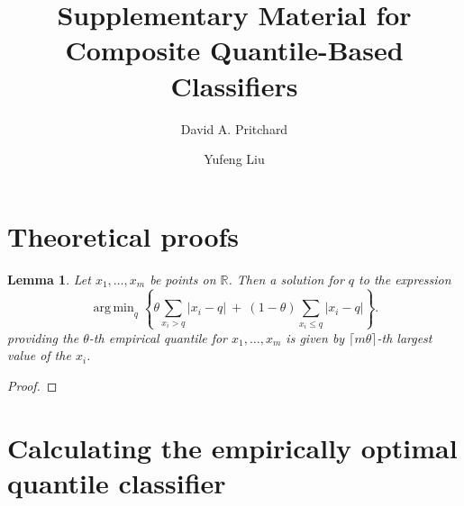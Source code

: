 \documentclass{article}
\DeclareMathOperator*{\argmin}{arg\,min}
\newtheorem{lemma}[theorem]{Lemma}
\begin{document}
\title{Supplementary Material for Composite Quantile-Based Classifiers}
\author[1]{David A. Pritchard}
\author[2]{Yufeng Liu}
\date{}
\maketitle

\section{Theoretical proofs}
\label{sec:theoretical-proofs}

\begin{lemma}
  \label{lem:empirical-quantlev}
  Let $x_1, \dots, x_m$ be points on $\mathbb{R}$.  Then a solution for $q$ to
  the expression
  \begin{equation}
    \label{eq:empirical-quantile}
    \argmin_q \left\{
      \theta \sum_{ x_{i} > q } |x_{i} - q| ~+~
      (1 - \theta) \sum_{ x_{i} \leq q } |x_{i} - q|
    \right\}.
  \end{equation}
  providing the $\theta$-th empirical quantile for
  $x_1, \dots, x_m$ is given by $\lceil m \theta \rceil$-th largest value of the
  $x_i$.
\end{lemma}

\begin{proof}
  
\end{proof}




\section{Calculating the empirically optimal quantile classifier}
\label{sec:empirically-optimal-algo}
\end{document}
